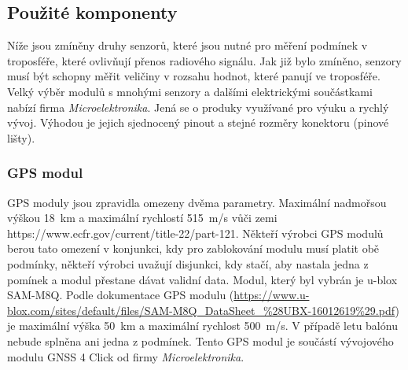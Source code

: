\documentclass[twoside]{ctuthesis}
\theoremstyle{plain}
\theoremstyle{definition}
\theoremstyle{note}
\begin{document}
			
		\subsection{Použité komponenty}
		Níže jsou zmíněny druhy senzorů, které jsou nutné pro měření podmínek v troposféře, které ovlivňují přenos radiového signálu. Jak již bylo zmíněno, senzory musí být schopny měřit veličiny v rozsahu hodnot, které panují ve troposféře. Velký výběr modulů s mnohými senzory a dalšími elektrickými součástkami nabízí firma \textit{Microelektronika}. Jená se o produky využívané pro výuku a rychlý vývoj. Výhodou je jejich sjednocený pinout a stejné rozměry konektoru (pinové lišty).



		
		\subsubsection{GPS modul}
		GPS moduly jsou zpravidla omezeny dvěma parametry. Maximální nadmořsou výškou 18~km a maximální rychlostí 515~m/s vůči zemi https://www.ecfr.gov/current/title-22/part-121. Někteří výrobci GPS modulů berou tato omezení v konjunkci, kdy pro zablokování modulu musí platit obě podmínky, někteří výrobci uvažují  disjunkci, kdy stačí, aby nastala jedna z pomínek a modul přestane dávat validní data. Modul, který byl vybrán je u-blox SAM-M8Q. Podle dokumentace GPS modulu (\url{https://www.u-blox.com/sites/default/files/SAM-M8Q_DataSheet_%28UBX-16012619%29.pdf}) je maximální výška 50~km a maximální rychlost 500~m/s. V případě letu balónu nebude splněna ani jedna z podmínek. Tento GPS modul je součástí vývojového modulu GNSS 4 Click od firmy \textit{Microelektronika}.
\end{document}
